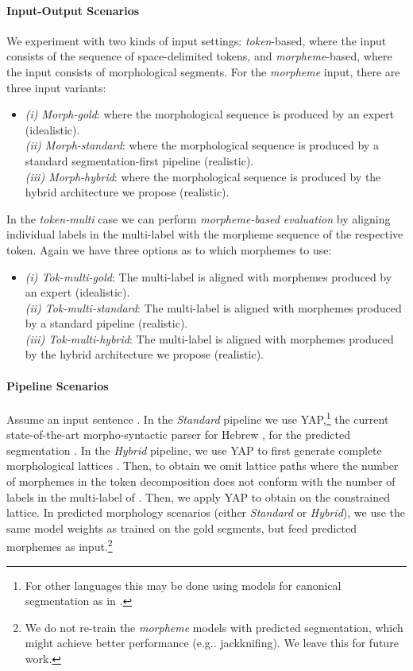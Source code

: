\documentclass[11pt,a4paper]{article}
\newcommand{\MULMACRO}{{\em token-multi}\xspace}
\newcommand{\MORMACRO}{{\em morpheme}\xspace}
\newcommand{\FLIPMACRO}{{\em Hybrid}\xspace}
\newcommand{\YAPMACRO}{{\em Standard}\xspace}
\begin{document}
\paragraph{Input-Output Scenarios}
We experiment with two kinds of input settings:
{\em token}-based, where the input consists of the sequence of space-delimited tokens, and \MORMACRO-based, where the input consists of  morphological segments. For the \MORMACRO input, there are three input variants:
    \begin{itemize}
    \item[] 
     {\em (i) Morph-gold}:  where the  morphological sequence is produced by an expert (idealistic). 
     \\ {\em (ii) Morph-standard}:  where the  morphological sequence is produced by a standard segmentation-first pipeline (realistic).
    \\ {\em (iii) Morph-hybrid}:  where the  morphological sequence is produced by the hybrid architecture we propose (realistic).
   \end{itemize}
     
In the \MULMACRO case we can perform {\em morpheme-based evaluation} by aligning individual labels in the multi-label with the morpheme sequence of the respective token.  Again we have three options as to which morphemes to use:
 
     \begin{itemize}
      \item[] {\em (i) Tok-multi-gold}:   The multi-label is aligned with morphemes produced by an expert (idealistic). 
    \\ {\em (ii) Tok-multi-standard}:   The  multi-label is aligned with morphemes produced by a standard pipeline (realistic).
  \\ {\em (iii) Tok-multi-hybrid}:   The multi-label  is aligned with morphemes produced by the hybrid architecture we propose (realistic).
\end{itemize} 

\paragraph{Pipeline Scenarios}
Assume an input sentence . In the \YAPMACRO
pipeline we use YAP,\footnote{For other languages this may be done using  models for canonical segmentation 
as in \cite{kann-etal-2016-neural}.} the current state-of-the-art morpho-syntactic  parser for  Hebrew \cite{more-etal-2019-joint}, for the predicted segmentation  . 
In the \FLIPMACRO pipeline, we use YAP to first generate complete morphological lattices  
. Then, to obtain  we omit lattice paths where the number of morphemes in the token decomposition  does not conform with the number of labels in the multi-label  of .
Then, we apply YAP to obtain  on the constrained lattice.
In predicted morphology scenarios (either \YAPMACRO or \FLIPMACRO), we use the same model weights  as  trained on the gold segments, but feed predicted morphemes as input.\footnote{We do not re-train the \MORMACRO models with predicted segmentation, which might achieve better performance (e.g.. jackknifing). We leave this for future work.}
     
\end{document}
